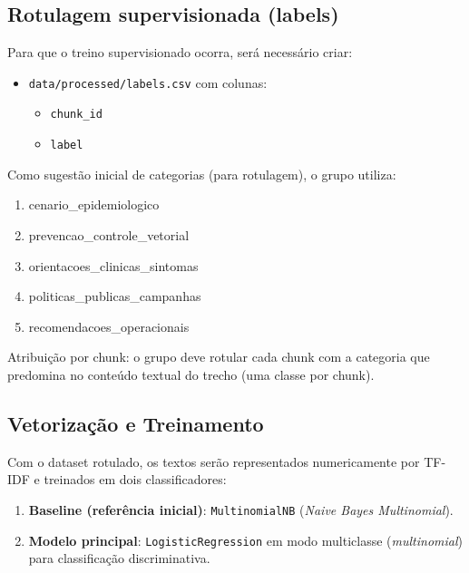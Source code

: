 \documentclass[12pt,a4paper]{article}
\begin{document}
\subsection{Rotulagem supervisionada (labels)}

Para que o treino supervisionado ocorra, será necessário criar:

\begin{itemize}[leftmargin=1.2cm]
    \item \texttt{data/processed/labels.csv} com colunas:
    \begin{itemize}
        \item \texttt{chunk\_id}
        \item \texttt{label}
    \end{itemize}
\end{itemize}

Como sugestão inicial de categorias (para rotulagem), o grupo utiliza:

\begin{enumerate}[leftmargin=1.2cm]
    \item cenario\_epidemiologico
    \item prevencao\_controle\_vetorial
    \item orientacoes\_clinicas\_sintomas
    \item politicas\_publicas\_campanhas
    \item recomendacoes\_operacionais
\end{enumerate}

\noindent
Atribuição por chunk: o grupo deve rotular cada chunk com a categoria que predomina no conteúdo textual do trecho (uma classe por chunk).

\subsection{Vetorização e Treinamento}

Com o dataset rotulado, os textos serão representados numericamente por TF-IDF e treinados em dois classificadores:

\begin{enumerate}[leftmargin=1.2cm]
    \item \textbf{Baseline (referência inicial)}: \texttt{MultinomialNB} (\textit{Naive Bayes Multinomial}).
    \item \textbf{Modelo principal}: \texttt{LogisticRegression} em modo multiclasse (\textit{multinomial}) para classificação discriminativa.
\end{enumerate}
\end{document}
